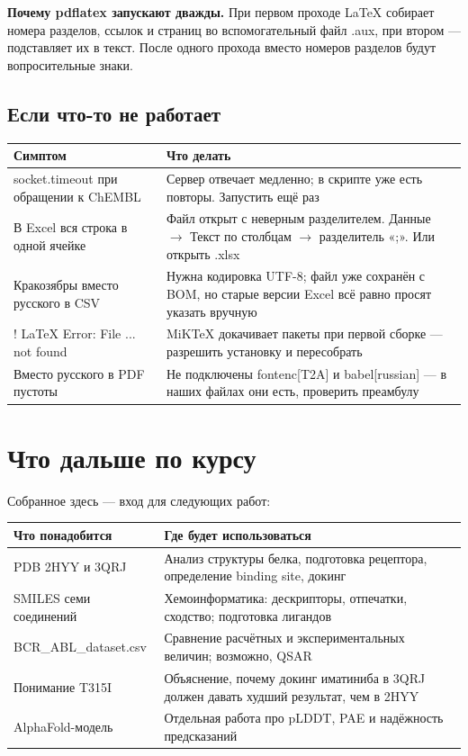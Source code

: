\documentclass[11pt,a4paper]{article}
\newcommand{\code}[1]{{\ttfamily #1}}
\begin{document}
\begin{note}
\textbf{Почему pdflatex запускают дважды.} При первом проходе LaTeX собирает
номера разделов, ссылок и страниц во вспомогательный файл \code{.aux}, при втором ---
подставляет их в текст. После одного прохода вместо номеров разделов будут
вопросительные знаки.
\end{note}

\subsection{Если что-то не работает}

\begin{center}
\small
\begin{tabular}{L{5.4cm}L{9.2cm}}
\toprule
\textbf{Симптом} & \textbf{Что делать} \\
\midrule
\code{socket.timeout} при обращении к ChEMBL & Сервер отвечает медленно; в скрипте уже есть повторы. Запустить ещё раз \\
В Excel вся строка в одной ячейке & Файл открыт с неверным разделителем. Данные $\rightarrow$ Текст по столбцам $\rightarrow$ разделитель «;». Или открыть .xlsx \\
Кракозябры вместо русского в CSV & Нужна кодировка UTF-8; файл уже сохранён с BOM, но старые версии Excel всё равно просят указать вручную \\
\code{! LaTeX Error: File ... not found} & MiKTeX докачивает пакеты при первой сборке --- разрешить установку и пересобрать \\
Вместо русского в PDF пустоты & Не подключены \code{fontenc[T2A]} и \code{babel[russian]} --- в наших файлах они есть, проверить преамбулу \\
\bottomrule
\end{tabular}
\end{center}

\section{Что дальше по курсу}

Собранное здесь --- вход для следующих работ:

\begin{center}
\small
\begin{tabular}{L{5.2cm}L{9.4cm}}
\toprule
\textbf{Что понадобится} & \textbf{Где будет использоваться} \\
\midrule
PDB 2HYY и 3QRJ & Анализ структуры белка, подготовка рецептора, определение binding site, докинг \\
SMILES семи соединений & Хемоинформатика: дескрипторы, отпечатки, сходство; подготовка лигандов \\
\code{BCR\_ABL\_dataset.csv} & Сравнение расчётных и экспериментальных величин; возможно, QSAR \\
Понимание T315I & Объяснение, почему докинг иматиниба в 3QRJ должен давать худший результат, чем в 2HYY \\
AlphaFold-модель & Отдельная работа про pLDDT, PAE и надёжность предсказаний \\
\bottomrule
\end{tabular}
\end{center}
\end{document}
